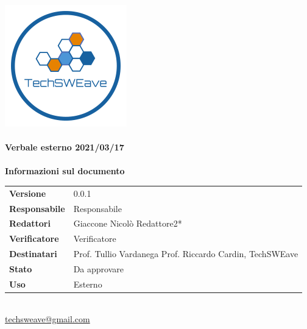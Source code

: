 \documentclass[a4paper]{article}
\begin{document}
\begin{titlepage}
    \begin{center}
        \includegraphics{../../../Images/logo.png}\\
        \vspace{20px}
        \textcolor{logo}{\hrulefill}\\
        \vspace{20px}
        \textbf{\huge\textcolor{logo}{Verbale esterno 2021/03/17}}\\
        \vspace{10px}
        \textcolor{logo}{\hrulefill}\\
        \vspace{40px}
        \textbf{\Large Informazioni sul documento}\\
        \vspace{20px}
        \begin{tabular}{p{100px} | p{100px}}
            \textbf{Versione} & 0.0.1\\
            \textbf{Responsabile} & Responsabile\\
            \textbf{Redattori} & Giaccone Nicolò \newline *Redattore2*\\
            \textbf{Verificatore} & Verificatore\\
            \textbf{Destinatari} & Prof. Tullio Vardanega \newline Prof. Riccardo Cardin, \newline TechSWEave\\
            \textbf{Stato} & Da approvare\\
            \textbf{Uso} & Esterno\\
        \end{tabular}\\
        \vspace{60px}
        \href{mailto:techsweave@gmail.com}{techsweave@gmail.com}\\

    \end{center}
    \end{titlepage}
\end{document}

